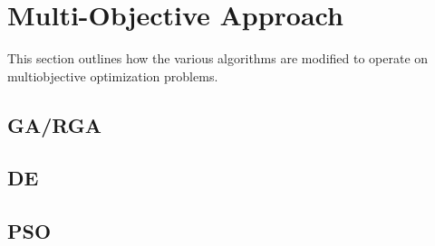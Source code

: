 \section{Multi-Objective Approach}

This section outlines how the various algorithms are modified to operate on multiobjective optimization problems.

\subsection{GA/RGA}
\subsection{DE}
\subsection{PSO}